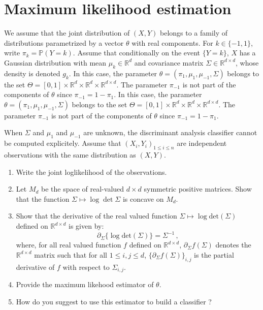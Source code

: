 \documentclass[a4paper,10pt,fleqn]{article}
\newcommand{\eqsp}{\,}
\newcommand{\rset}{\ensuremath{\mathbb{R}}}
\newcommand{\bP}{\mathbb{P}}
\newcommand{\1}{\ensuremath{\mathbbm{1}}}
\begin{document}
\section{Maximum likelihood estimation}
We assume that the joint distribution of $(X,Y)$ belongs to a family of distributions parametrized by a vector $\theta$ with real components. For $k\in\{-1,1\}$, write $\pi_k = \bP(Y = k)$. Assume that conditionally on the event $\{Y = k\}$, $X$ has a Gaussian distribution with mean $\mu_k \in\rset^d$ and covariance matrix $\Sigma\in \rset^{d\times d}$, whose density is denoted $g_k$. In this case, the parameter $\theta=(\pi_1, \mu_1,\mu_{-1}, \Sigma)$ belongs to the set $\Theta= [0,1] \times \rset^d \times \rset^d \times \rset^{d \times d}$. The parameter $\pi_{-1}$ is not part of the components of $\theta$ since $\pi_{-1}=1-\pi_{1}$. In this case, the parameter $\theta=(\pi_1, \mu_1,\mu_{-1}, \Sigma)$ belongs to the set $\Theta= [0,1] \times \mathbb{R}^d \times \mathbb{R}^d \times \mathbb{R}^{d \times d}$. The parameter $\pi_{-1}$ is not part of the components of $\theta$ since $\pi_{-1}=1-\pi_{1}$. 

When $\Sigma$ and $\mu_1$ and $\mu_{-1}$ are unknown, the  discriminant analysis classifier cannot be computed explicitely. Assume that  $(X_i,Y_i)_{1\leqslant i\leqslant n}$ are independent observations with the same distribution as $(X,Y)$.
\begin{enumerate}
\item Write the joint loglikelihood of the observations.
\item Let $M_d$ be the space of real-valued $d \times d$ symmetric positive matrices. Show that the function $\Sigma \mapsto \log \det \Sigma$ is concave on $M_d$.
\item Show that the derivative of the real valued function $\Sigma \mapsto \log\mathrm{det}(\Sigma)$ defined on $\rset^{d\times d}$ is given by:
$$
\partial_{\Sigma}\{\log\mathrm{det}(\Sigma)\}= \Sigma^{-1}\eqsp,
$$
where, for all real valued function $f$ defined on $\rset^{d\times d}$, $\partial_{\Sigma}f(\Sigma)$ denotes the $\rset^{d\times d}$ matrix such that for all $1\leqslant i,j\leqslant d$, $\{\partial_{\Sigma}f(\Sigma)\}_{i,j}$ is the partial derivative of $f$ with respect to $\Sigma_{i,j}$.
\item Provide the maximum likehood estimator of $\theta$.
\item How do you suggest to use this estimator to build a classifier ?
\end{enumerate}
\end{document}
